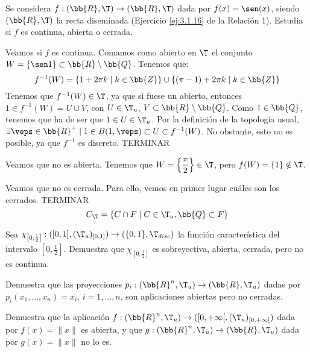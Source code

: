 \begin{ejercicio}
    Se considera $f : (\bb{R},\T) \to (\bb{R},\T)$ dada por $f(x) = \sen(x)$, siendo $(\bb{R},\T)$ la recta diseminada (Ejercicio \ref{ej:3.1.16} de la Relación 1). Estudia si $f$ es continua, abierta o cerrada.

    Veamos si $f$ es continua. Comamos como abierto en $\T$ el conjunto $W=\{\sen 1\}\subset \bb{R}\setminus \bb{Q}$. Tenemos que:
    \begin{equation*}
        f^{-1}(W)=\{1+2\pi k\mid k\in \bb{Z}\} \cup \{(\pi-1)+2\pi k\mid k\in \bb{Z}\}
    \end{equation*}
    Tenemos que $f^{-1}(W)\in \T$, ya que si fuese un abierto, entonces $1\in f^{-1}(W)=U\cup V$, con $U\in \T_u$, $V\subset \bb{R}\setminus \bb{Q}$. Como $1\in \bb{Q}$, tenemos que ha de ser que $1\in U\in \T_u$. Por la definición de la topología usual, $\exists \veps\in \bb{R}^+\mid 1\in B(1,\veps)\subset U\subset f^{-1}(W)$. No obstante, esto no es posible, ya que $f^{-1}$ es discreto. TERMINAR

    Veamos que no es abierta. Tenemos que $W=\left\{\dfrac{\pi}{2}\right\}\in \T$, pero $f(W)=\{1\}\notin \T$.

    Veamos que no es cerrada. Para ello, vemos en primer lugar cuáles son los cerrados. TERMINAR
    \begin{equation*}
        C_\T=\{C\cap F\mid C\in \T_u, \bb{Q}\subset F\}
    \end{equation*}
\end{ejercicio}

\begin{ejercicio}
    Sea $\chi_{\left[0,\frac{1}{2}\right]}: ([0, 1],(\T_u)_{[0,1]}) \to (\{0, 1\}, \T_{disc})$ la función característica del intervalo $\left[0,\frac{1}{2}\right]$.
    Demuestra que $\chi_{\left[0,\frac{1}{2}\right]}$ es sobreyectiva, abierta, cerrada, pero no es continua.
\end{ejercicio}


\begin{ejercicio}
    Demuestra que las proyecciones $p_i: (\bb{R}^n, \T_u) \to (\bb{R}, \T_u)$ dadas por $p_i(x_1, \dots , x_n) = x_i$, $i = 1, \dots, n$, son aplicaciones abiertas pero no cerradas.
\end{ejercicio}

\begin{ejercicio}
    Demuestra que la aplicación $f : (\bb{R}^n, \T_u) \to ([0, +\infty[,(\T_u)_{[0,+\infty[})$ dada por $f(x) = \|x\|$ es abierta, y que $g : (\bb{R}^n, \T_u) \to (\bb{R}, \T_u)$ dada por $g(x) = \|x\|$ no lo es.
\end{ejercicio}

